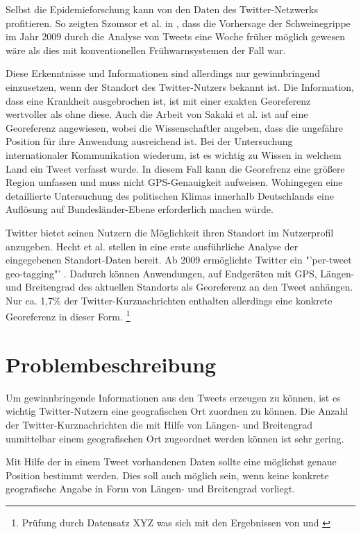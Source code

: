 		Selbst die Epidemieforschung kann von den Daten des Twitter-Netzwerks profitieren. 
		So zeigten Szomsor et al. in \cite{Szomszor2011}, dass die Vorhersage der Schweinegrippe im Jahr 2009 durch die Analyse von Tweets eine Woche früher möglich gewesen wäre als dies mit konventionellen Frühwarnsystemen der Fall war. 

		Diese Erkenntnisse und Informationen sind allerdings nur gewinnbringend einzusetzen, wenn der Standort des Twitter-Nutzers bekannt ist. 
		Die Information, dass eine Krankheit ausgebrochen ist, ist mit einer exakten Georeferenz wertvoller als ohne diese. 
		Auch die Arbeit von Sakaki et al. ist auf eine Georeferenz angewiesen, wobei die Wissenschaftler angeben, dass die ungefähre Position für ihre Anwendung ausreichend ist.
		Bei der Untersuchung internationaler Kommunikation wiederum, ist es wichtig zu Wissen in welchem Land ein Tweet verfasst wurde.
		In diesem Fall kann die Georefrenz eine größere Region umfassen und muss nicht GPS-Genauigkeit aufweisen.  
		Wohingegen eine detaillierte Untersuchung des politischen Klimas innerhalb Deutschlands eine Auflösung auf Bundesländer-Ebene erforderlich machen würde. 

 		Twitter bietet seinen Nutzern die Möglichkeit ihren Standort im Nutzerprofil anzugeben. 
 		Hecht et al. stellen in \cite{Hecht2011} eine erste ausführliche Analyse der eingegebenen Standort-Daten bereit.  
 		Ab 2009 ermöglichte Twitter ein "'per-tweet geo-tagging"' \cite{Cheng2010}.
 		Dadurch können Anwendungen, auf Endgeräten mit GPS, Längen- und Breitengrad des aktuellen Standorts als Georeferenz an den Tweet anhängen.    
		Nur ca. 1,7\% der Twitter-Kurznachrichten enthalten allerdings eine konkrete Georeferenz in dieser Form. \footnote{Prüfung durch Datensatz XYZ was sich mit den Ergebnissen von \cite{Priedhorsky2013} und \cite{Schulz2013}}


	\section{Problembeschreibung} 

		Um gewinnbringende Informationen aus den Tweets erzeugen zu können, ist es wichtig Twitter-Nutzern eine geografischen Ort zuordnen zu können.
		Die Anzahl der Twitter-Kurznachrichten die mit Hilfe von Längen- und Breitengrad unmittelbar einem geografischen Ort zugeordnet werden können ist sehr gering. 
		 
		Mit Hilfe der in einem Tweet vorhandenen Daten sollte eine möglichst genaue Position bestimmt werden. 
		Dies soll auch möglich sein, wenn keine konkrete geografische Angabe in Form von Längen- und Breitengrad vorliegt. 


